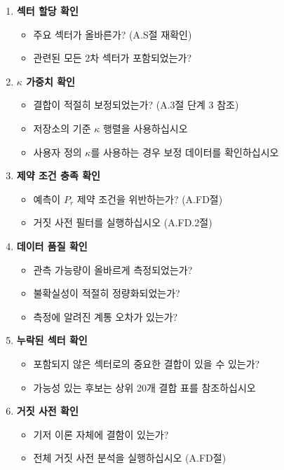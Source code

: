\documentclass[13pt,a4paper]{article}
\begin{document}
	\begin{enumerate}
		\item \textbf{섹터 할당 확인} 
		\begin{itemize}
			\item 주요 섹터가 올바른가? (A.S절 재확인)
			\item 관련된 모든 2차 섹터가 포함되었는가?
		\end{itemize}
		
		\item \textbf{$\kappa$ 가중치 확인}
		\begin{itemize}
			\item 결합이 적절히 보정되었는가? (A.3절 단계 3 참조)
			\item 저장소의 기준 $\kappa$ 행렬을 사용하십시오
			\item 사용자 정의 $\kappa$를 사용하는 경우 보정 데이터를 확인하십시오
		\end{itemize}
		
		\item \textbf{제약 조건 충족 확인}
		\begin{itemize}
			\item 예측이 $P_r$ 제약 조건을 위반하는가? (A.FD절)
			\item 거짓 사전 필터를 실행하십시오 (A.FD.2절)
		\end{itemize}
		
		\item \textbf{데이터 품질 확인}
		\begin{itemize}
			\item 관측 가능량이 올바르게 측정되었는가?
			\item 불확실성이 적절히 정량화되었는가?
			\item 측정에 알려진 계통 오차가 있는가?
		\end{itemize}
		
		\item \textbf{누락된 섹터 확인}
		\begin{itemize}
			\item 포함되지 않은 섹터로의 중요한 결합이 있을 수 있는가?
			\item 가능성 있는 후보는 상위 20개 결합 표를 참조하십시오
		\end{itemize}
		
		\item \textbf{거짓 사전 확인}
		\begin{itemize}
			\item 기저 이론 자체에 결함이 있는가?
			\item 전체 거짓 사전 분석을 실행하십시오 (A.FD절)
		\end{itemize}
		

\end{enumerate}
\end{document}
